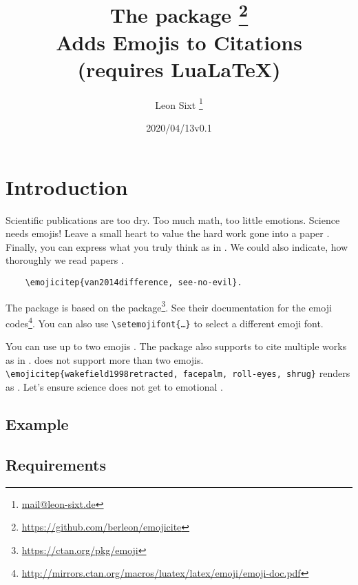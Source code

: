 \documentclass{l3doc}
\title{The \pkg{emojicite} package \thanks{\url{https://github.com/berleon/emojicite}} \\
  Adds Emojis to Citations \\
  \normalsize (requires Lua\LaTeX)}
\author{Leon Sixt \thanks{\url{mail@leon-sixt.de}}}
\date{\emoji{date} 2020/04/13\quad v0.1}
\begin{document}
\maketitle

\tableofcontents

\setlength{\parskip}{0.5em}

\section{Introduction}

Scientific publications are too dry. Too much math, too little emotions. Science
needs emojis!
Leave a small heart to value the hard work gone into a paper .
Finally, you can express what you truly think as in .
We could also indicate, how thoroughly we read papers .

\begin{verbatim}
    \emojicitep{van2014difference, see-no-evil}.
\end{verbatim}


The package is based on the  package\footnote{\url{https://ctan.org/pkg/emoji}}.
See their documentation for the emoji codes\footnote{\url{http://mirrors.ctan.org/macros/luatex/latex/emoji/emoji-doc.pdf}}. You can also use \texttt{\textbackslash setemojifont\{\dots\}} to select a different emoji font.


You can use up to two emojis . The package also supports
to cite multiple works as in .
 does not support more than two emojis.
\texttt{\textbackslash emojicitep\{wakefield1998retracted, facepalm, roll-eyes, shrug\}}
renders as .
Let's ensure science does not get to emotional .

\newpage
\subsection{Example}


\subsection{Requirements}
\end{document}
